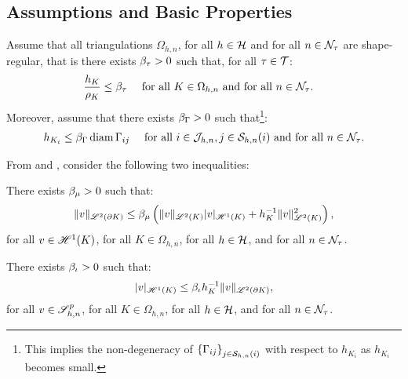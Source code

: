 \newpage
\subsection{Assumptions and Basic Properties}

Assume that all triangulations $\Omega_{h, n}$, for all $h \in \mathcal{H}$ and for all $n \in \mathcal{N}_{\tau}$ are shape-regular, that is there exists $\beta_{\tau} > 0$ such that, for all $\tau \in \mathcal{T}$:
\begin{align}
    \frac{h_K}{\rho_K} &\leq \beta_{\tau} &\text{ for all } K \in \Omega_{h, n} \text{ and for all } n \in \mathcal{N}_{\tau}. \label{equation:ass_h}
&\end{align}
Moreover, assume that there exists $\beta_{\Gamma} > 0$ such that\footnote{This implies the non-degeneracy of $\left\{ \Gamma_{ij} \right\}_{j \in \mathcal{S}_{h, n}(i)}$ with respect to $h_{K_i}$ as $h_{K_i}$ becomes small.}:
\begin{align}
    h_{K_i} &\leq \beta_{\Gamma} \operatorname*{diam} \Gamma_{ij} &\text{ for all } i \in \mathcal{J}_{h, n}, j \in \mathcal{S}_{h, n}(i) \text{ and for all } n \in \mathcal{N}_{\tau}. \label{equation:ass_hd}
\end{align}

From \cite{Dolejší2002} and \cite{Ciarlet1978}, consider the following two inequalities:

\begin{lemma}
    There exists $\beta_{\mu} > 0$ such that:
    \begin{align}
        \lVert v \rVert_{\mathscr{L}^{2}(\partial K)} \leq \beta_{\mu} \left( \lVert v \rVert_{\mathscr{L}^{2}(K)} \lvert v \rvert_{\mathscr{H}^{1}(K)} + h_K^{-1} \lVert v \rVert_{\mathscr{L}^{2}(K)}^2 \right),
    \end{align}
    for all $v \in \mathscr{H}^{1}(K)$, for all $K \in \Omega_{h, n}$, for all $h \in \mathcal{H}$, and for all $n \in \mathcal{N}_{\tau}$.
\end{lemma}

\begin{lemma}
    There exists $\beta_{\iota} > 0$ such that:
    \begin{align}
        \lvert v \rvert_{\mathscr{H}^{1}(K)} \leq \beta_{\iota} h_K^{-1} \lVert v \rVert_{\mathscr{L}^{2}(\partial K)},
    \end{align}
    for all $v \in \mathscr{S}^p_{h, n}$, for all $K \in \Omega_{h, n}$, for all $h \in \mathcal{H}$, and for all $n \in \mathcal{N}_{\tau}$.
\end{lemma}

